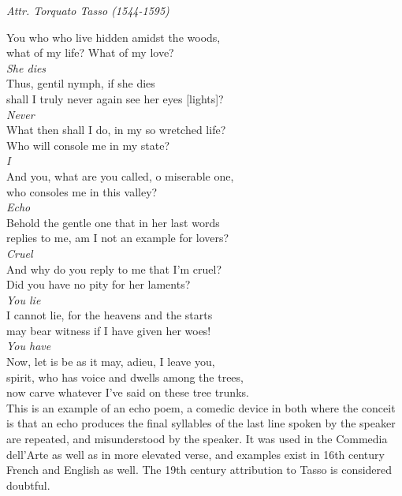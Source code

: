 \documentclass[12pt, twocolumn]{text-translation}
\begin{document}
{\raggedleft \textit{Attr. Torquato Tasso (1544-1595)}\par}
\poemasterisks
You who who live hidden amidst the woods, \\
what of my life? What of my love? \\
\hspace*{1cm}\textit{She dies} \\
Thus, gentil nymph, if she dies \\
shall I truly never again see her eyes [lights]? \\
\hspace*{1cm}\textit{Never} \\
What then shall I do, in my so wretched life? \\
Who will console me in my state? \\
\hspace*{1cm}\textit{I} \\
And you, what are you called, o miserable one, \\
who consoles me in this valley? \\
\hspace*{1cm}\textit{Echo} \\
Behold the gentle one that in her last words \\
replies to me, am I not an example for lovers? \\
\hspace*{1cm}\textit{Cruel} \\
And why do you reply to me that I'm cruel? \\
Did you have no pity for her laments? \\
\hspace*{1cm}\textit{You lie} \\
I cannot lie, for the heavens and the starts \\
may bear witness if I have given her woes! \\
\hspace*{1cm}\textit{You have} \\
Now, let is be as it may, adieu, I leave you, \\
spirit, who has voice and dwells among the trees, \\
now carve whatever I've said on these tree trunks. \\


 This is an example of an echo poem,
a comedic device in both where the conceit is that an echo
produces the final syllables of the last line spoken by the
speaker are repeated, and misunderstood by the speaker. It was used
in the Commedia dell'Arte as well as in more elevated verse, and
examples exist in 16th century French and English as well. The
19th century attribution to Tasso is considered doubtful.
\end{document}
